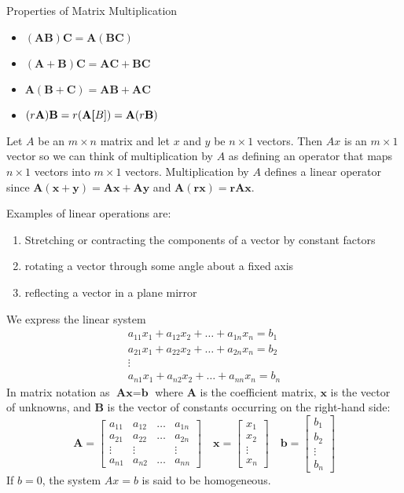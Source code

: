 \documentclass[../diffeq.tex]{subfiles}
\begin{document}
Properties of Matrix Multiplication
\begin{itemize}
    \item $(\textbf{A}\textbf{B})\textbf{C}=\textbf{A}(\textbf{B}\textbf{C})$
    \item $(\textbf{A}+\textbf{B})\textbf{C}=\textbf{A}\textbf{C}+\textbf{B}\textbf{C}$
    \item $\textbf{A}(\textbf{B}+\textbf{C})=\textbf{A}\textbf{B}+\textbf{A}\textbf{C}$
    \item $(r\textbf{A})\textbf{B}=r(\textbf{A}\textbf[B])=\textbf{A}(r\textbf{B})$
\end{itemize}

Let $A$ be an $m\times n$ matrix and let $x$ and $y$ be $n\times 1$ vectors. Then $Ax$ is an $m\times 1$ vector so we can think of multiplication by $A$ as defining an operator that maps 
$n\times 1$ vectors into $m\times 1$ vectors. Multiplication by $A$ defines a linear operator since $\textbf{A}(\textbf{x}+\textbf{y})=\textbf{A}\textbf{x}+\textbf{A}\textbf{y}$ and $\textbf{A}(\textbf{r}\textbf{x})=\textbf{r}\textbf{A}\textbf{x}$.

Examples of linear operations are:
\begin{enumerate}
    \item Stretching or contracting the components of a vector by constant factors 
    \item rotating a vector through some angle about a fixed axis 
    \item reflecting a vector in a plane mirror
\end{enumerate}

We express the linear system 
\begin{align*}
    a_{11}x_1+a_{12}x_2+\dots + a_{1n}x_n=b_1\\
    a_{21}x_1+a_{22}x_2+\dots + a_{2n}x_n = b_2\\
    \vdots \\
    a_{n1}x_1+a_{n2}x_2+\dots + a_{nn}x_n=b_n
\end{align*}
In matrix notation as $\textbf{A}\textbf{x}=\textbf{b}$ where $\textbf{A}$ is the coefficient matrix, $\textbf{x}$ is the vector of unknowns, and $\textbf{B}$ is the vector of constants occurring on the right-hand side:
\[ \textbf{A}=\begin{bmatrix}
    a_{11}&a_{12}&\dots & a_{1n}\\
    a_{21}& a_{22} & \dots & a_{2n}\\
    \vdots & \vdots & & \vdots \\
    a_{n1} & a_{n2} & \dots & a_{nn}
\end{bmatrix} \quad \textbf{x}=\begin{bmatrix}
    x_1\\x_2\\\vdots \\x_n
\end{bmatrix}
\quad \textbf{b}=\begin{bmatrix}
    b_1\\b_2\\\vdots\\b_n
\end{bmatrix}
\]
If $b=0$, the system $Ax=b$ is said to be homogeneous.
\end{document}
